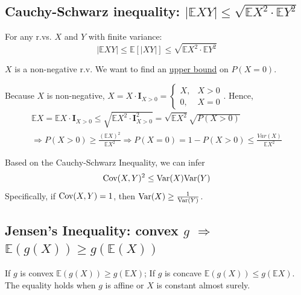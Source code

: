 \documentclass[11pt]{elegantbook}
\begin{document}
\subsection{Cauchy-Schwarz inequality: $|\mathbb{E}XY|\leq \sqrt{\mathbb{E}X^2\cdot \mathbb{E}Y^2}$}
\begin{proposition}
    For any r.vs. $X$ and $Y$ with finite variance: $$|\mathbb{E}XY|\leq \mathbb{E}[|XY|]\leq \sqrt{\mathbb{E}X^2\cdot \mathbb{E}Y^2}$$
\end{proposition}
\begin{example}
$X$ is a non-negative r.v. We want to find an \underline{upper bound} on $P(X=0)$.
\end{example}
Because $X$ is non-negative, $X=X\cdot \textbf{I}_{X>0}=\left\{\begin{matrix}
    X,&X>0\\
    0,&X=0
\end{matrix}\right.$. Hence,
\begin{equation}
    \begin{aligned}
        \mathbb{E}X= \mathbb{E}X\cdot \textbf{I}_{X>0}\leq \sqrt{\mathbb{E} X^2\cdot \textbf{I}^2_{X>0}}=\sqrt{\mathbb{E}X^2}\sqrt{P(X>0)}\\
        \Rightarrow P(X>0)\geq\frac{(\mathbb{E}X)^2}{\mathbb{E}X^2} \Rightarrow P(X=0)=1-P(X>0)\leq \frac{Var(X)}{\mathbb{E}X^2}
    \end{aligned}
    \nonumber
\end{equation}
\begin{corollary}
    Based on the Cauchy-Schwarz Inequality, we can infer
    $$\textnormal{Cov}(X,Y)^2\leq \textnormal{Var}(X)\textnormal{Var}(Y)$$
    Specifically, if $\textnormal{Cov}(X,Y)=1$, then $\textnormal{Var}(X)\geq \frac{1}{\textnormal{Var}(Y)}$.
\end{corollary}

\subsection{Jensen's Inequality: convex $g$ $\Rightarrow$ $\mathbb{E}(g(X))\geq g(\mathbb{E}(X))$}

\begin{proposition}\label{Jen_in}
    If $g$ is convex $\mathbb{E}(g(X))\geq g(\mathbb{E}X)$; If $g$ is concave $\mathbb{E}(g(X))\leq g(\mathbb{E}X)$.
    The equality holds when $g$ is affine or $X$ is constant almost surely.
\end{proposition}
\end{document}
